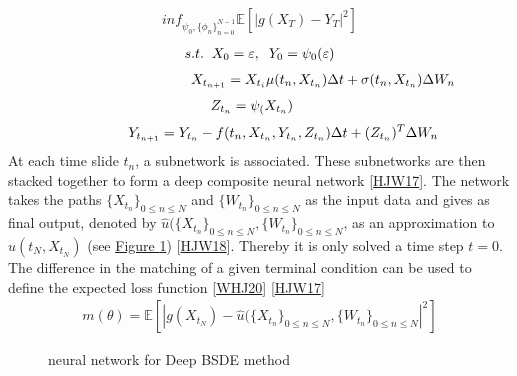 \documentclass[letterpaper,10pt,english]{jupyterBook}
\let\sphinxpxdimen\pdfpxdimen\else\newdimen\sphinxpxdimen
\begin{document}
\begin{equation*}
\begin{split} inf_{\psi_0,\{\phi_n\}^{N-1}_{n=0}} \mathbb{E}[|g(X_T) - Y_T|^2] \end{split}
\end{equation*}\begin{equation*}
\begin{split} s.t. \hspace{0.2cm} X_0 = \varepsilon, \hspace{0.2cm} Y_0 = \psi_0(\varepsilon)\end{split}
\end{equation*}\begin{equation*}
\begin{split} \hspace{3.2cm} X_{t_{n+1}} = X_{t_i} \mu(t_n,X_{t_n}) \Delta t + \sigma(t_n,X_{t_n}) \Delta W_n\end{split}
\end{equation*}\begin{equation*}
\begin{split} Z_{t_n} = \psi_(X_{t_n}) \hspace{0.4cm}\end{split}
\end{equation*}\begin{equation*}
\begin{split}  \hspace{1.2cm}Y_{t_{n+1}} = Y_{t_n} - f(t_n,X_{t_n},Y_{t_n},Z_{t_n})\Delta t  + (Z_{t_n})^T \Delta W_n\end{split}
\end{equation*}
\sphinxAtStartPar
At each time slide \(t_n\), a subnetwork is associated. These subnetworks are then stacked together to form a deep composite neural network {[}\hyperlink{cite.Discussion:id27}{HJW17}{]}. The network takes the paths  \(\{X_{t_n}\}_{0\leq n \leq N}\) and \(\{W_{t_n}\}_{0\leq n \leq N}\) as the input data and gives as final output, denoted by \(\hat{u}(\{ X_{t_n}\}_{0 \leq n \leq N}, \{W_{t_n}\}_{0 \leq n \leq N}\),  as an approximation to \(u(t_N, X_{t_N})\) (see \hyperref[\detokenize{Reinforcement_learning:bsdn-fig}]{Figure \ref{\detokenize{Reinforcement_learning:bsdn-fig}}}) {[}\hyperlink{cite.Discussion:id30}{HJW18}{]}. Thereby it is only solved a time step \(t=0\). The difference in the matching of a given terminal condition can be used to define the expected loss function {[}\hyperlink{cite.Discussion:id28}{WHJ20}{]} {[}\hyperlink{cite.Discussion:id27}{HJW17}{]}
\begin{equation*}
\begin{split} m(\theta) = \mathbb{E}[|g(X_{t_N}) - \hat{u}(\{ X_{t_n}\}_{0 \leq n \leq N}, \{W_{t_n}\}_{0 \leq n \leq N} |^2]\end{split}
\end{equation*}
\begin{figure}[htbp]
\centering
\capstart

\noindent\sphinxincludegraphics[width=500\sphinxpxdimen,height=300\sphinxpxdimen]{{BSDE_NN}.png}
\caption{neural network for Deep BSDE method}\label{\detokenize{Reinforcement_learning:bsdn-fig}}\end{figure}
\end{document}
